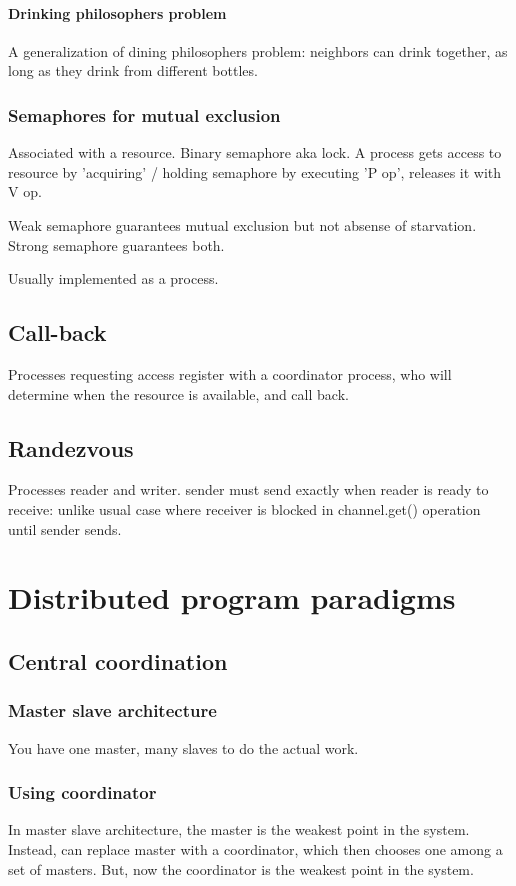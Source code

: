 \documentclass[oneside, article]{memoir}
\begin{document}
\paragraph*{Drinking philosophers problem}
A generalization of dining philosophers problem: neighbors can drink together, as long as they drink from different bottles.

\subsubsection{Semaphores for mutual exclusion}
Associated with a resource. Binary semaphore aka lock. A process gets access to resource by 'acquiring' / holding semaphore by executing 'P op', releases it with V op.

Weak semaphore guarantees mutual exclusion but not absense of starvation. Strong semaphore guarantees both.

Usually implemented as a process.

\subsection{Call-back}
Processes requesting access register with a coordinator process, who will determine when the resource is available, and call back.

\subsection{Randezvous}
Processes reader and writer. sender must send exactly when reader is ready to receive: unlike usual case where receiver is blocked in channel.get() operation until sender sends.

\section{Distributed program paradigms}
\subsection{Central coordination}
\subsubsection{Master slave architecture}
You have one master, many slaves to do the actual work.

\subsubsection{Using coordinator}
In master slave architecture, the master is the weakest point in the system. Instead, can replace master with a coordinator, which then chooses one among a set of masters. But, now the coordinator is the weakest point in the system.
\end{document}
